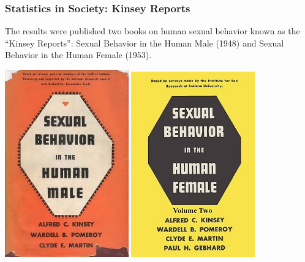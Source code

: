 \documentclass[handout]{beamer}
\begin{document}
\begin{frame}
\frametitle{Statistics in Society: Kinsey Reports}
The results were published two books on human sexual behavior known as the ``Kinsey Reports'': Sexual Behavior in the Human Male (1948) and Sexual Behavior in the Human Female (1953).  

\begin{center}
\includegraphics[width=0.4\textwidth]{./figure/kinsey_male.jpg}
\includegraphics[width=0.4\textwidth]{./figure/kinsey_female.jpg}
\end{center}

\end{frame}
\end{document}
